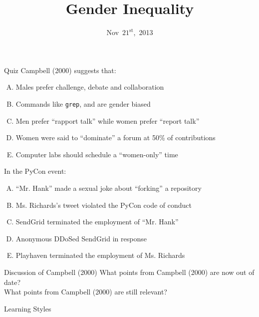 \documentclass{beamer}
\title{Gender Inequality}
\date{Nov~$21^{\text{st}}$,~2013}
\begin{document}
\begin{frame}
\titlepage
\end{frame}

\begin{frame}{Quiz}
Campbell (2000) suggests that:
\begin{enumerate}[(A)]
\item<1> Males prefer challenge, debate and collaboration %
\item<1> Commands like \texttt{grep},  and  are gender biased %
\item<1> Men prefer ``rapport talk'' while women prefer ``report talk'' %
\item<1> Women were said to ``dominate'' a forum at 50\% of contributions %
\item<1-2> Computer labs should schedule a ``women-only'' time
\end{enumerate}
\bigskip
In the PyCon event:
\begin{enumerate}[(A)]
\item<1> ``Mr. Hank'' made a sexual joke about ``forking'' a repository %
\item<1> Ms. Richards's tweet violated the PyCon code of conduct %
\item<1> SendGrid terminated the employment of ``Mr. Hank'' %
\item<1-2> Anonymous DDoSed SendGrid in response
\item<1> Playhaven terminated the employment of Ms. Richards %
\end{enumerate}
\end{frame}

\begin{frame}{Discussion of Campbell (2000)}
What points from Campbell (2000) are now out of date?\\[5em]
What points from Campbell (2000) are still relevant?
\end{frame}

\begin{frame}{Learning Styles}
\end{frame}
\end{document}
